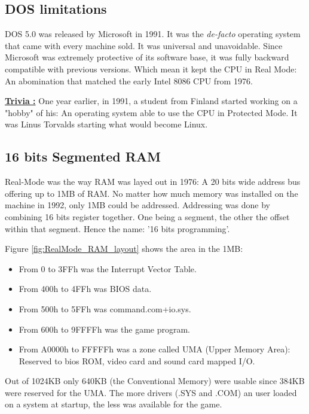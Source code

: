 \documentclass[book.tex]{subfiles}
\begin{document}
  \subsection{DOS limitations}
DOS 5.0 was released by Microsoft in 1991. It was the \emph{de-facto} operating system that came with every machine sold. It was universal and unavoidable. Since Microsoft was extremely protective of its software base, it was fully backward compatible with previous versions. Which mean it kept the CPU in Real Mode: An abomination that matched the early 
Intel 8086 CPU from 1976.

\bigskip

 \textbf{\underline{Trivia :}} One year earlier, in 1991, a student from Finland started working on a "hobby" of his: An operating system able to use the CPU in Protected Mode. It was Linus Torvalds starting what would become Linux.



  \subsection{16 bits Segmented RAM}
  Real-Mode was the way RAM was layed out in 1976: A 20 bits wide address bus offering up to 1MB of RAM. No matter how much memory was installed on the machine in 1992, only 1MB could be addressed. Addressing was done by combining 16 bits register together. One being a segment, the other the offset within that segment. Hence the name: '16 bits programming'.

  \bigskip

Figure \ref{fig:RealMode_RAM_layout} shows the area in the 1MB:
  \begin{itemize}
  

\item From 0 to 3FFh was the Interrupt Vector Table.
\item From 400h to 4FFh was BIOS data.
\item From 500h to 5FFh was command.com+io.sys.
\item From 600h to 9FFFFh  was the game program. 
\item From A0000h to FFFFFh was a zone called UMA (Upper Memory Area): Reserved to bios ROM, video card and sound card mapped I/O.
\end{itemize}

Out of 1024KB only 640KB (the Conventional Memory) were usable since 384KB were reserved for the UMA. The more drivers (.SYS and .COM) an user loaded on a system at startup, the less was available for the game.
\end{document}
